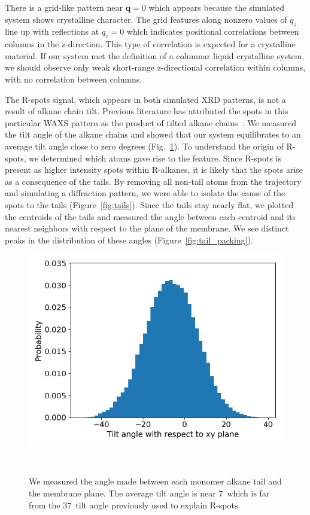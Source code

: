 \documentclass[journal=jpcbfk,manusciprt=article]{achemso}
\begin{document}
  There is a grid-like pattern near $\mathbf{q}=0$ which appears because the
  simulated system shows crystalline character. The grid features along nonzero
  values of $q_z$ line up with reflections at $q_z=0$ which indicates positional
  correlations between columns in the z-direction. This type of correlation is
  expected for a crystalline material. If our system met the definition of a
  columnar liquid crystalline system, we should observe only weak short-range
  z-directional correlation within columns, with no correlation between
  columns\cite{chaikin_principles_1995}. 

  The R-spots signal, which appears in both simulated XRD patterns, is not a
  result of alkane chain tilt. Previous literature has attributed the spots in
  this particular WAXS pattern as the product of tilted alkane
  chains~\cite{feng_scalable_2014}. We measured the tilt angle of the alkane
  chains and showed that our system equilibrates to an average tilt angle close
  to zero degrees (Fig.~\ref{fig:tilt}). To understand the origin of R-spots,
  we determined which atoms gave rise to the feature. Since R-spots is present as
  higher intensity spots within R-alkanes, it is likely that the spots arise as a
  consequence of the tails. By removing all non-tail atoms from the trajectory
  and simulating a diffraction pattern, we were able to isolate the cause of the
  spots to the tails (Figure~\ref{fig:tails}). Since the tails stay nearly flat,
  we plotted the centroids of the tails and measured the angle between each
  centroid and its nearest neighbors with respect to the plane of the membrane.
  We see distinct peaks in the distribution of these angles
  (Figure~\ref{fig:tail_packing}).

  \begin{figure}
  \centering
  \includegraphics[width=0.5\linewidth]{tilt_dist.png}
  \caption{We measured the angle made between each monomer alkane tail and the
	  membrane plane. The average tilt angle is near 7\degree~which is far from the
	  37\degree~tilt angle previously used to explain R-spots.}~\label{fig:tilt}
  \end{figure}
\end{document}
